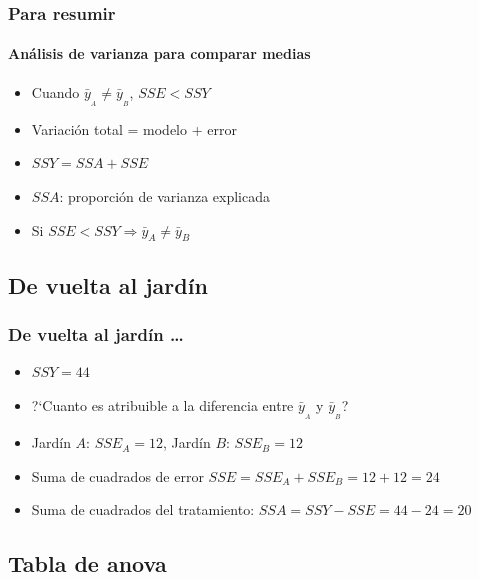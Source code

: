 \documentclass[mathserif]{beamer}
\begin{document}
\begin{frame}[label=anov13]
   \frametitle{Para resumir}
   \framesubtitle{An\'alisis de varianza para comparar medias}
    \begin{itemize}
      \item<1-| visible@1-| handout:1> Cuando $\bar{y}_{_A}\neq \bar{y}_{_B}$, $SSE < SSY$
      \item<2-| visible@2-| handout:1> Variaci\'on total = modelo + error
      \item<3-| visible@3-| handout:1> $SSY = SSA+SSE$
      \item<4-| visible@4-| handout:1> $SSA$: proporci\'on de varianza explicada 
      \item<5-| visible@5-| handout:1> Si $SSE<SSY \Rightarrow \bar{y}_A\neq\bar{y}_B$
   \end{itemize}
\end{frame}%


\subsection[En el jard\'in]{De vuelta al jard\'in}
 
\begin{frame}[label=anov15]
   \frametitle{De vuelta al jard\'in \ldots}
    \begin{itemize}
      \item $SSY=44$
      \item ?`Cuanto es atribuible a la diferencia entre $\bar{y}_{_A}$ y $\bar{y}_{_B}$?
      \item Jard\'in $A$: $SSE_A=12$, Jard\'in $B$: $SSE_B=12$
      \item Suma de cuadrados de error $SSE=SSE_A+SSE_B=12+12=24$
      \item Suma de cuadrados del tratamiento: $SSA=SSY-SSE=44-24=20$
   \end{itemize}
\end{frame}%


\subsection[Tabla de anova]{Tabla de anova}
\end{document}
